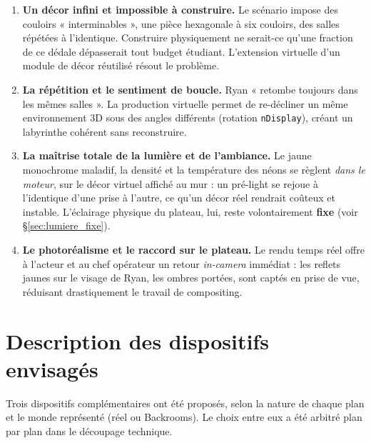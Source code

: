\documentclass[11pt,a4paper]{report}
\begin{document}
\begin{infobox}[title={Quatre arguments décisifs}]
\begin{enumerate}
\item \textbf{Un décor infini et impossible à construire.} Le scénario impose des couloirs « interminables », une pièce hexagonale à six couloirs, des salles répétées à l'identique. Construire physiquement ne serait-ce qu'une fraction de ce dédale dépasserait tout budget étudiant. L'extension virtuelle d'un module de décor réutilisé résout le problème.
\item \textbf{La répétition et le sentiment de boucle.} Ryan « retombe toujours dans les mêmes salles ». La production virtuelle permet de re-décliner un même environnement 3D sous des angles différents (rotation \texttt{nDisplay}), créant un labyrinthe cohérent sans reconstruire.
\item \textbf{La maîtrise totale de la lumière et de l'ambiance.} Le jaune monochrome maladif, la densité et la température des néons se règlent \emph{dans le moteur}, sur le décor virtuel affiché au mur : un pré-light se rejoue à l'identique d'une prise à l'autre, ce qu'un décor réel rendrait coûteux et instable. L'éclairage physique du plateau, lui, reste volontairement \textbf{fixe} (voir §\ref{sec:lumiere_fixe}).
\item \textbf{Le photoréalisme et le raccord sur le plateau.} Le rendu temps réel offre à l'acteur et au chef opérateur un retour \emph{in-camera} immédiat : les reflets jaunes sur le visage de Ryan, les ombres portées, sont captés en prise de vue, réduisant drastiquement le travail de compositing.
\end{enumerate}
\end{infobox}

\section{Description des dispositifs envisagés}
Trois dispositifs complémentaires ont été proposés, selon la nature de chaque plan et le monde représenté (réel ou Backrooms). Le choix entre eux a été arbitré plan par plan dans le découpage technique.
\end{document}
